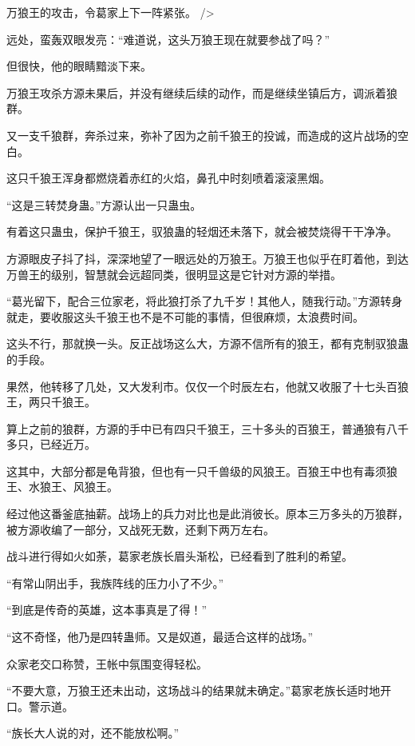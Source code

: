 
\begin{this_body}

万狼王的攻击，令葛家上下一阵紧张。 />

远处，蛮轰双眼发亮：“难道说，这头万狼王现在就要参战了吗？”

但很快，他的眼睛黯淡下来。

万狼王攻杀方源未果后，并没有继续后续的动作，而是继续坐镇后方，调派着狼群。

又一支千狼群，奔杀过来，弥补了因为之前千狼王的投诚，而造成的这片战场的空白。

这只千狼王浑身都燃烧着赤红的火焰，鼻孔中时刻喷着滚滚黑烟。

“这是三转焚身蛊。”方源认出一只蛊虫。

有着这只蛊虫，保护千狼王，驭狼蛊的轻烟还未落下，就会被焚烧得干干净净。

方源眼皮子抖了抖，深深地望了一眼远处的万狼王。万狼王也似乎在盯着他，到达万兽王的级别，智慧就会远超同类，很明显这是它针对方源的举措。

“葛光留下，配合三位家老，将此狼打杀了九千岁！其他人，随我行动。”方源转身就走，要收服这头千狼王也不是不可能的事情，但很麻烦，太浪费时间。

这头不行，那就换一头。反正战场这么大，方源不信所有的狼王，都有克制驭狼蛊的手段。

果然，他转移了几处，又大发利市。仅仅一个时辰左右，他就又收服了十七头百狼王，两只千狼王。

算上之前的狼群，方源的手中已有四只千狼王，三十多头的百狼王，普通狼有八千多只，已经近万。

这其中，大部分都是龟背狼，但也有一只千兽级的风狼王。百狼王中也有毒须狼王、水狼王、风狼王。

经过他这番釜底抽薪。战场上的兵力对比也是此消彼长。原本三万多头的万狼群，被方源收编了一部分，又战死无数，还剩下两万左右。

战斗进行得如火如荼，葛家老族长眉头渐松，已经看到了胜利的希望。

“有常山阴出手，我族阵线的压力小了不少。”

“到底是传奇的英雄，这本事真是了得！”

“这不奇怪，他乃是四转蛊师。又是奴道，最适合这样的战场。”

众家老交口称赞，王帐中氛围变得轻松。

“不要大意，万狼王还未出动，这场战斗的结果就未确定。”葛家老族长适时地开口。警示道。

“族长大人说的对，还不能放松啊。”


\end{this_body}
